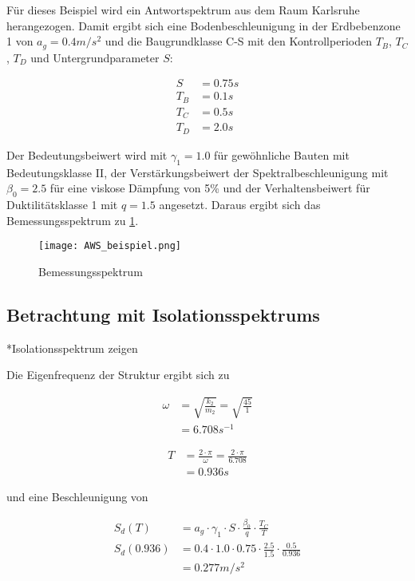 Für dieses Beispiel wird ein Antwortspektrum aus dem Raum Karlsruhe herangezogen. Damit ergibt sich eine Bodenbeschleunigung in der Erdbebenzone 1 von $a_g = 0.4 m/s^2$ und die Baugrundklasse C-S mit den Kontrollperioden $T_B$, $T_C$, $T_D$ und Untergrundparameter $S$:

\begin{align*}
S &= 0.75 s\\
T_B &= 0.1 s\\
T_C &= 0.5 s\\
T_D &= 2.0 s
\end{align*}

Der Bedeutungsbeiwert wird mit $\gamma_1 = 1.0$ für gewöhnliche Bauten mit Bedeutungsklasse II, der Verstärkungsbeiwert der Spektralbeschleunigung mit $\beta_0 = 2.5$ für eine viskose Dämpfung von 5\% und der Verhaltensbeiwert für Duktilitätsklasse 1 mit $q = 1.5$ angesetzt.
Daraus ergibt sich das Bemessungsspektrum zu \cref{fig:Bemessungsspektrum}.

\begin{figure}[ht] 
    \centering
    \texttt{[image: AWS\_beispiel.png]}
    \caption{Bemessungsspektrum}
    \label{fig:Bemessungsspektrum}
\end{figure}

\subsection{Betrachtung mit Isolationsspektrums}

*Isolationsspektrum zeigen

Die Eigenfrequenz der Struktur ergibt sich zu

\begin{align*}
\omega &= \sqrt{\frac{k_2}{m_2}} = \sqrt{\frac{45}{1}}\\
       &= 6.708 s^{-1}
\end{align*}

\begin{align*}
T &= \frac{2 \cdot \pi}{\omega} = \frac{2 \cdot \pi}{6.708}\\
  &= 0.936 s
\end{align*}

und eine Beschleunigung von

\begin{align*}
S_d(T) &= a_g \cdot \gamma_1 \cdot S \cdot \frac{\beta_0}{q} \cdot \frac{T_C}{T}\\
S_d(0.936) &= 0.4 \cdot 1.0 \cdot 0.75 \cdot \frac{2.5}{1.5} \cdot \frac{0.5}{0.936}\\
           &= 0.277 m/s^2
\end{align*}

